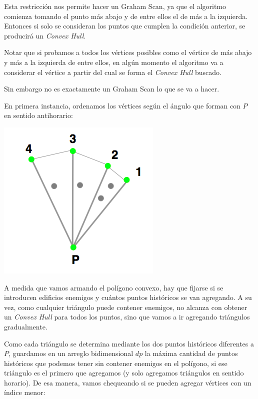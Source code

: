 Esta restricción nos permite hacer un Graham Scan, ya que el algoritmo comienza tomando el punto más abajo y de
entre ellos el de más a la izquierda. Entonces si solo se consideran los puntos que cumplen la condición anterior,
se producirá un \textit{Convex Hull}. 

Notar que si probamos a todos los vértices posibles como el vértice de más abajo y más a la izquierda de entre ellos,
en algún momento el algoritmo va a considerar el vértice a partir del cual se forma el \textit{Convex Hull} buscado.

Sin embargo no es exactamente un Graham Scan lo que se va a hacer.

En primera instancia, ordenamos los vértices según el ángulo que forman con $P$ en sentido antihorario:

\includegraphics[scale=0.5]{img/ej34.png}

A medida que vamos armando el polígono convexo, hay que fijarse si se introducen edificios enemigos y cuántos
puntos históricos se van agregando. A su vez, como cualquier triángulo puede contener enemigos, no alcanza
con obtener un \textit{Convex Hull} para todos los puntos, sino que vamos a ir agregando triángulos gradualmente.

Como cada triángulo se determina mediante los dos puntos históricos diferentes a $P$, guardamos en un arreglo 
bidimensional $dp$ la máxima cantidad de puntos históricos que podemos tener sin contener enemigos en el polígono, si 
ese triángulo es el primero que agregamos (y solo agregamos triángulos en sentido horario). De esa manera, vamos 
chequeando si se pueden agregar vértices con un índice menor:

